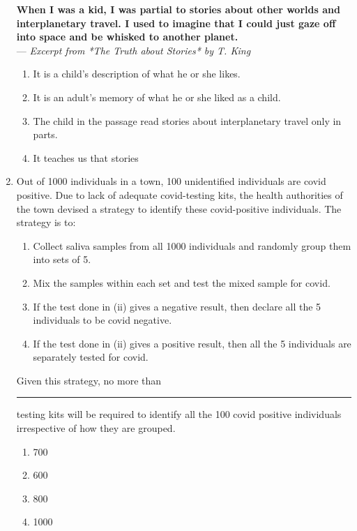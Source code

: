 \documentclass[journal]{IEEEtran}
\begin{document}
\begin{enumerate}
\medskip

\noindent
\textbf{When I was a kid, I was partial to stories about other worlds and interplanetary travel. I used to imagine that I could just gaze off into space and be whisked to another planet.}\\
\hfill --- \textit{Excerpt from *The Truth about Stories* by T. King}

\medskip

\begin{enumerate}
    \item It is a child's description of what he or she likes.
    \item It is an adult's memory of what he or she liked as a child.
    \item The child in the passage read stories about interplanetary travel only in parts.
    \item It teaches us that stories
    \end{enumerate}
    \hfill{}
    
  \item 
Out of 1000 individuals in a town, 100 unidentified individuals are covid positive. Due to lack of adequate covid-testing kits, the health authorities of the town devised a strategy to identify these covid-positive individuals. The strategy is to:

\begin{enumerate}[label=(\roman*)]
    \item Collect saliva samples from all 1000 individuals and randomly group them into sets of 5.
    \item Mix the samples within each set and test the mixed sample for covid.
    \item If the test done in (ii) gives a negative result, then declare all the 5 individuals to be covid negative.
    \item If the test done in (ii) gives a positive result, then all the 5 individuals are separately tested for covid.
\end{enumerate}

Given this strategy, no more than \rule{2cm}{0.15mm} testing kits will be required to identify all the 100 covid positive individuals irrespective of how they are grouped.



\begin{enumerate}
    \item 700
    \item 600
    \item 800
    \item 1000
    \end{enumerate}
    \hfill{}
    

\end{enumerate}
\end{document}
